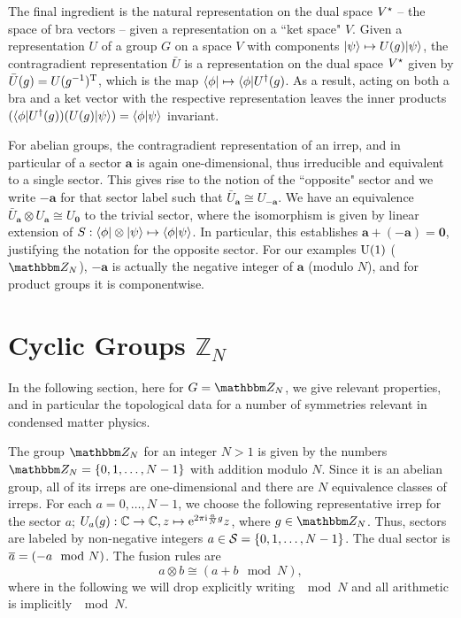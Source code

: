 The final ingredient is the natural representation on the dual space $V^\star$ -- the space of bra vectors -- given a representation on a ``ket space" $V$.
%
Given a representation $U$ of a group $G$ on a space $V$ with components $\ket{\psi} \mapsto U(g) \ket{\psi}$, the contragradient representation $\bar{U}$ is a representation on the dual space $V^\star$ given by $\bar{U}(g) = U(g^{-1})^{\text{T}}$, which is the map $\bra{\phi} \mapsto \bra{\phi} U^\dagger(g)$.
%
As a result, acting on both a bra and a ket vector with the respective representation leaves the inner products $\rBr{\bra{\phi} U^\dagger(g) }\rBr{U(g) \ket{\psi}} = \braket{\phi}{\psi}$ invariant.

For abelian groups, the contragradient representation of an irrep, and in particular of a sector $\mathbf{a}$ is again one-dimensional, thus irreducible and equivalent to a single sector.
%
This gives rise to the notion of the ``opposite" sector and we write $-\mathbf{a}$ for that sector label such that $\bar{U}_\mathbf{a} \cong U_{-\mathbf{a}}$.
%
We have an equivalence $\bar{U}_\mathbf{a} \otimes U_\mathbf{a} \cong U_\mathbf{0}$ to the trivial sector, where the isomorphism is given by linear extension of $S: \bra{\phi} \otimes \ket{\psi} \mapsto \braket{\phi}{\psi}$.
%
In particular, this establishes $\mathbf{a} + (-\mathbf{a}) = \mathbf{0}$, justifying the notation for the opposite sector.
%
For our examples $\mathrm{U}(1)$ ($\Zbb_N$), $-\mathbf{a}$ is actually the negative integer of $\mathbf{a}$ (modulo $N$), and for product groups it is componentwise.


\section[Cyclic Groups ZN]{Cyclic Groups $\mathbb{Z}_N$}
\label{sec:topo_data:ZN}

In the following section, here for $G = \Zbb_N$, we give relevant properties, and in particular the topological data for a number of symmetries relevant in condensed matter physics.

The group $\Zbb_N$ for an integer $N > 1$ is given by the numbers $\Zbb_N = \set{0, 1, \dots, N - 1}$ with addition modulo $N$.
%
Since it is an abelian group, all of its irreps are one-dimensional and there are $N$ equivalence classes of irreps.
%
For each $a = 0, \dots, N - 1$, we choose the following representative irrep for the sector $a$;
$U_a(g) : \mathbb{C} \to \mathbb{C} , z \mapsto \mathrm{e}^{2\pi\mathrm{i} \frac{a}{N} g} z$, where $g \in \Zbb_N$.
%
Thus, sectors are labeled by non-negative integers $a \in \mathcal{S} = \set{0,1,\dots, N-1}$. The dual sector is $\overline{a} = (-a \mod N)$.
%
The fusion rules are 
\begin{equation}
    a \otimes b \cong (a + b \mod N)
    ,
\end{equation}
where in the following we will drop explicitly writing $\mod N$ and all arithmetic is implicitly $\mod N$.

